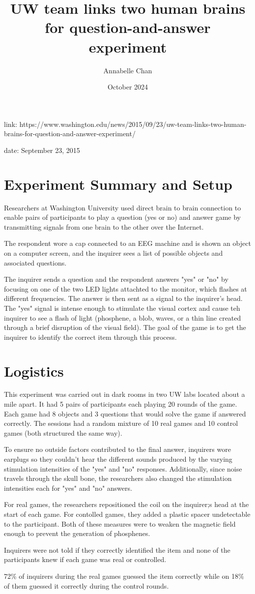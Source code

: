 \documentclass[12pt]{article}
\title{UW team links two human brains for question-and-answer experiment}
\author{Annabelle Chan}
\date{October 2024}
\begin{document}
\maketitle

link: https://www.washington.edu/news/2015/09/23/uw-team-links-two-human-brains-for-question-and-answer-experiment/

date: September 23, 2015

\section{Experiment Summary and Setup}

Researchers at Washington University used direct brain to brain connection to enable pairs of participants to play a question (yes or no) and answer game by transmitting signals from one brain to the other over the Internet.

The respondent wore a cap connected to an EEG machine and is shown an object on a computer screen, and the inquirer sees a list of possible objects and associated questions.

The inquirer sends a question and the respondent answers "yes" or "no" by focusing on one of the two LED lights attachted to the monitor, which flashes at different frequencies. The answer is then sent as a signal to the inquirer's head. The "yes" signal is intense enough to stimulate the visual cortex and cause teh inquirer to see a flash of light (phosphene, a blob, waves, or a thin line created through a brief disruption of the visual field). The goal of the game is to get the inquirer to identify the correct item through this process.

\section{Logistics}

This experiment was carried out in dark rooms in two UW labs located about a mile apart. It had 5 pairs of participants each playing 20 rounds of the game. Each game had 8 objects and 3 questions that would solve the game if answered correctly. The sessions had a random mixture of 10 real games and 10 control games (both structured the same way).

To ensure no outside factors contributed to the final answer, inquirers wore earplugs so they couldn't hear the different sounds produced by the varying stimulation intensities of the "yes" and "no" responses. Additionally, since noise travels through the skull bone, the researchers also changed the stimulation intensities each for "yes" and "no" answers. 

For real games, the researchers repositioned the coil on the inquirer;s head at the start of each game. For contolled games, they added a plastic spacer undetectable to the participant. Both of these measures were to weaken the magnetic field enough to prevent the generation of phosphenes.

Inquirers were not told if they correctly identified the item and none of the participants knew if each game was real or controlled.

72\% of inquirers during the real games guessed the item correctly while on 18\% of them guessed it correctly during the control rounds.
\end{document}
